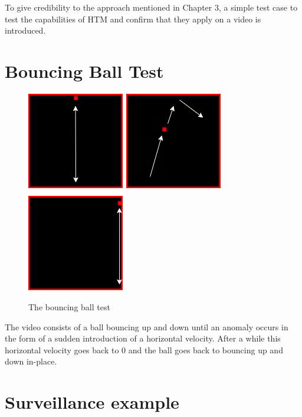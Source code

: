 To give credibility to the approach mentioned in Chapter 3, a simple test case to test the capabilities of HTM and confirm that they apply on a video is introduced.
\section{Bouncing Ball Test}

\begin{figure}[H]
\centering
\includegraphics[width=.3\textwidth]{resources/experiments/bouncing_ball/bb_updown1.png}\hfill
\includegraphics[width=.3\textwidth]{resources/experiments/bouncing_ball/bb_updownside.png}\hfill
\includegraphics[width=.3\textwidth]{resources/experiments/bouncing_ball/bb_updown2.png}
\caption{The bouncing ball test}
\label{fig:bb}
\end{figure}
The video consists of a ball bouncing up and down until an anomaly occurs in the form of a sudden introduction of a horizontal velocity. After a while this horizontal velocity goes back to 0 and the ball goes back to bouncing up and down in-place.
\section{Surveillance example}